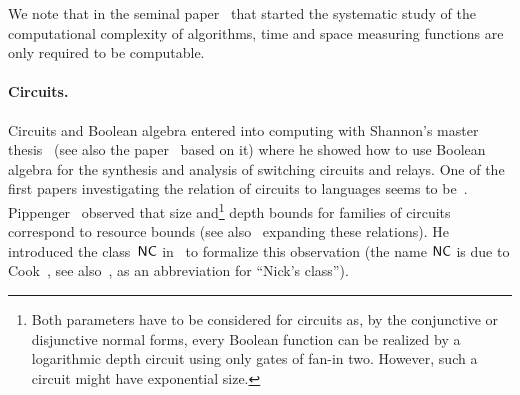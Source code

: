 We note that in the seminal paper~\cite{HartmanisStearns1965}
that started the systematic study of the computational complexity of algorithms, 
time and space measuring functions are only required to be computable.


\paragraph{Circuits.} 
Circuits and Boolean algebra entered into computing with Shannon's master thesis~\cite{Shannon:1937:SAR} (see also the paper~\cite{Shannon:1938:SAR} based on it) 
where he showed how to use Boolean algebra for the synthesis and analysis of switching circuits and relays. One of the first papers investigating the relation of circuits to languages
seems to be~\cite{DBLP:conf/stoc/Cook79}.
Pippenger~\cite{DBLP:conf/focs/Pippenger79b} observed that size and\footnote{Both parameters have 
	to be considered for circuits as, by the conjunctive or disjunctive normal forms, every Boolean function can be realized
	by a logarithmic depth circuit using only gates of fan-in two. However, such a circuit might have
	exponential size.}
depth bounds for families of circuits correspond to resource bounds (see also~\cite{DBLP:journals/siamcomp/Borodin77,DBLP:journals/jcss/Ruzzo81,DBLP:journals/siamcomp/StockmeyerV84} 
expanding these relations).
He introduced the class~$\textup{\textsf{NC}}$ in~\cite{DBLP:conf/focs/Pippenger79b} 
to formalize this observation (the name $\textup{\textsf{NC}}$ is due to Cook~\cite[p.~338]{DBLP:conf/stoc/Cook79}, see also~\cite{DBLP:journals/iandc/Cook85}, as an abbreviation for ``Nick's class'').

